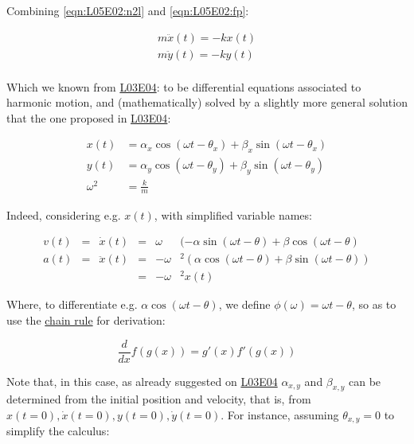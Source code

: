 \documentclass[solutions.tex]{subfiles}
\begin{document}
Combining \eqref{eqn:L05E02:n2l} and \eqref{eqn:L05E02:fp}:

\begin{equation}
	\label{eqn:L05E02:ediff}
	\begin{aligned}
		m\ddot{x}(t) = -kx(t) \\
		m\ddot{y}(t) = -ky(t) \\
	\end{aligned}
\end{equation}

Which we known from
\href{https://tales.mbivert.com/on-the-harmonic-oscillator/}{L03E04}:
to be differential equations associated to harmonic motion, and
(mathematically) solved by a slightly more general solution that the
one proposed in
\href{https://tales.mbivert.com/on-the-harmonic-oscillator/}{L03E04}:

\begin{equation}
	\label{eqn:L05E02:sols}
	\begin{aligned}
		x(t) &= \alpha_x\cos(\omega t-\theta_x)+\beta_x\sin(\omega t-\theta_x) \\
		y(t) &= \alpha_y\cos(\omega t-\theta_y)+\beta_y\sin(\omega t-\theta_y) \\
		\omega^2 &= \frac{k}{m}
	\end{aligned}
\end{equation}

Indeed, considering e.g. $x(t)$, with simplified variable names:

\begin{equation}
	\begin{aligned}
		v(t) &=& \dot{x}(t) &=& \omega&(-\alpha\sin(\omega t-\theta)+\beta\cos(\omega t-\theta) \\
		a(t) &=& \ddot{x}(t) &=& -\omega&^2(\alpha\cos(\omega t-\theta)+\beta\sin(\omega t-\theta)) \\
		~ &~& ~ &=& -\omega&^2x(t)
	\end{aligned}
\end{equation}

Where, to differentiate e.g. $\alpha\cos(\omega t - \theta)$, we define
$\phi(\omega) = \omega t - \theta$, so as to use the
\href{https://en.wikipedia.org/wiki/Chain\_rule}{chain rule}
for derivation:

\begin{equation}
	\frac{d}{dx}f(g(x)) = g'(x)f'(g(x))
\end{equation}

Note that, in this case, as already suggested on
\href{https://tales.mbivert.com/on-the-harmonic-oscillator/}{L03E04}
$\alpha_{x,y}$ and $\beta_{x,y}$ can be
determined from the initial position and velocity, that is, from
$x(t=0), \dot{x}(t=0), y(t=0), \dot{y}(t=0)$. For instance,
assuming $\theta_{x,y}=0$ to simplify the calculus:
\end{document}
